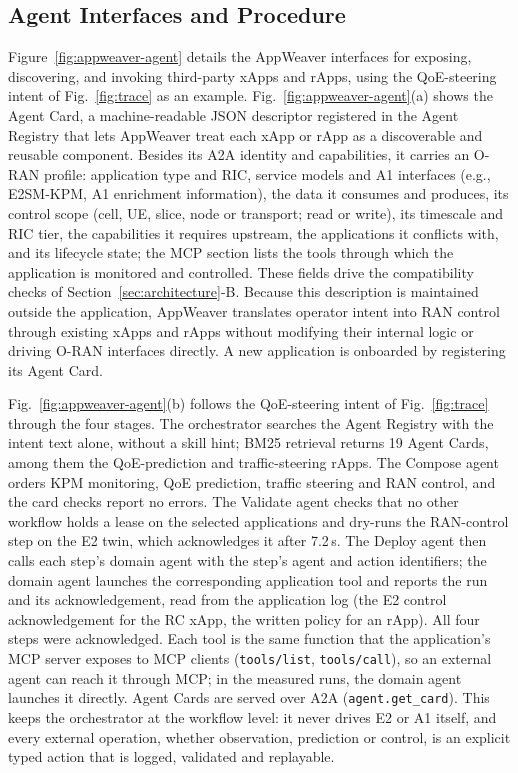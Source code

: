 \documentclass[conference]{IEEEtran}
\begin{document}
\subsection{Agent Interfaces and Procedure}
Figure~\ref{fig:appweaver-agent} details the AppWeaver interfaces for exposing, discovering, and invoking third-party xApps and rApps, using the QoE-steering intent of Fig.~\ref{fig:trace} as an example. Fig.~\ref{fig:appweaver-agent}(a) shows the Agent Card, a machine-readable JSON descriptor registered in the Agent Registry that lets AppWeaver treat each xApp or rApp as a discoverable and reusable component. Besides its A2A identity and capabilities, it carries an O-RAN profile: application type and RIC, service models and A1 interfaces (e.g., E2SM-KPM, A1 enrichment information), the data it consumes and produces, its control scope (cell, UE, slice, node or transport; read or write), its timescale and RIC tier, the capabilities it requires upstream, the applications it conflicts with, and its lifecycle state; the MCP section lists the tools through which the application is monitored and controlled. These fields drive the compatibility checks of Section~\ref{sec:architecture}-B. Because this description is maintained outside the application, AppWeaver translates operator intent into RAN control through existing xApps and rApps without modifying their internal logic or driving O-RAN interfaces directly. A new application is onboarded by registering its Agent Card.

Fig.~\ref{fig:appweaver-agent}(b) follows the QoE-steering intent of Fig.~\ref{fig:trace} through the four stages. The orchestrator searches the Agent Registry with the intent text alone, without a skill hint; BM25 retrieval returns 19 Agent Cards, among them the QoE-prediction and traffic-steering rApps. The Compose agent orders KPM monitoring, QoE prediction, traffic steering and RAN control, and the card checks report no errors. The Validate agent checks that no other workflow holds a lease on the selected applications and dry-runs the RAN-control step on the E2 twin, which acknowledges it after 7.2\,s. The Deploy agent then calls each step's domain agent with the step's agent and action identifiers; the domain agent launches the corresponding application tool and reports the run and its acknowledgement, read from the application log (the E2 control acknowledgement for the RC xApp, the written policy for an rApp). All four steps were acknowledged. Each tool is the same function that the application's MCP server exposes to MCP clients (\texttt{tools/list}, \texttt{tools/call}), so an external agent can reach it through MCP; in the measured runs, the domain agent launches it directly. Agent Cards are served over A2A (\texttt{agent.get\_card}). This keeps the orchestrator at the workflow level: it never drives E2 or A1 itself, and every external operation, whether observation, prediction or control, is an explicit typed action that is logged, validated and replayable.
\end{document}
